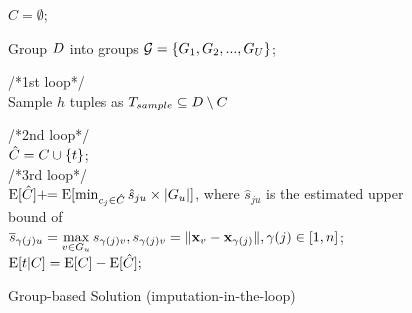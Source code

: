 
\begin{figure}[!t]
 \vspace{-1em}
	\begin{algorithm}[H]
		\normalem
	\caption{Group-based \ours Solution (imputation-in-the-loop) \label{alg:group}}
		{\small
			
		
		
		$C=\emptyset$;\\
		
		Group $D$ into groups $\mathcal{G} = \{ G_1, G_2, ..., G_U \}$;\\
		
		\While{$|\core|< \numcore$}
		{
			
		/*1st loop*/  \\
		
		Sample $h$ tuples as $T_{sample} \subseteq D \setminus C$\\
		
			{
				
				/*2nd loop*/ \\
				 $\hat{C} = C \cup \{t\}$;\\
				 {
				 	/*3rd loop*/ \\
				 
				 		$\mathrm{E}[\hat{C}] +\!\!= \mathrm{E}[\min_{c_j\in \hat{C}}\hat{s}_{ju} \times |G_u|]$, where $\hat{s}_{ju}$ is the estimated upper bound of \\\quad\quad  $\overline{s}_{\gamma(j)u} = \max\limits_{v \in G_u} s_{\gamma(j)v}, s_{\gamma(j)v} = \lVert\mathbf{x}_v - \mathbf{x}_{\gamma(j)}\rVert, \gamma(j)\in[1, n]$;\\
			     }
		         $\mathrm{E}[t|C] = \mathrm{E}[C] - \mathrm{E}[\hat{C}];$
				 
}}}
\end{algorithm}
\end{figure}
